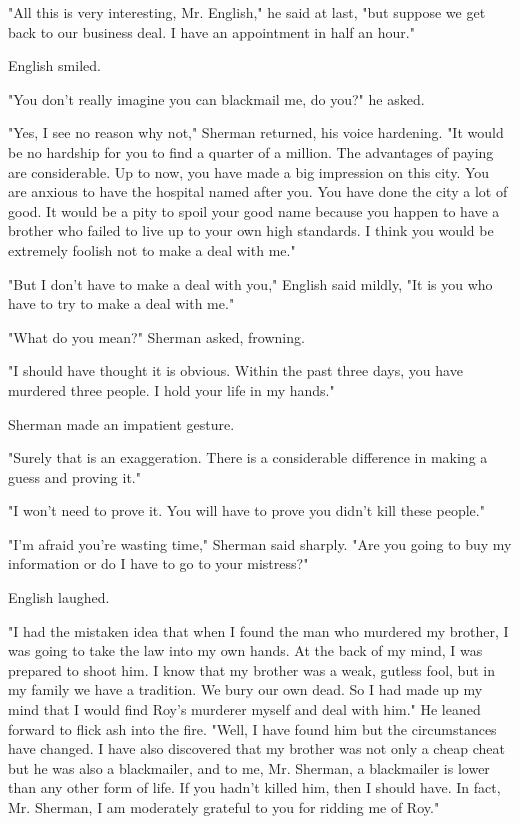 \documentclass{novel}
\begin{document}
"All this is very interesting, Mr. English," he said at last, "but suppose we get back to our business deal. I have an appointment in half an hour."

English smiled.

"You don't really imagine you can blackmail me, do you?" he asked.

"Yes, I see no reason why not," Sherman returned, his voice hardening. "It would be no hardship for you to find a quarter of a million. The advantages of paying are considerable. Up to now, you have made a big impression on this city. You are anxious to have the hospital named after you. You have done the city a lot of good. It would be a pity to spoil your good name because you happen to have a brother who failed to live up to your own high standards. I think you would be extremely foolish not to make a deal with me."

"But I don't have to make a deal with you," English said mildly, "It is you who have to try to make a deal with me."

"What do you mean?" Sherman asked, frowning.

"I should have thought it is obvious. Within the past three days, you have murdered three people. I hold your life in my hands."

Sherman made an impatient gesture.

"Surely that is an exaggeration. There is a considerable difference in making a guess and proving it."

"I won't need to prove it. You will have to prove you didn't kill these people."

"I'm afraid you're wasting time," Sherman said sharply. "Are you going to buy my information or do I have to go to your mistress?"

English laughed.

"I had the mistaken idea that when I found the man who murdered my brother, I was going to take the law into my own hands. At the back of my mind, I was prepared to shoot him. I know that my brother was a weak, gutless fool, but in my family we have a tradition. We bury our own dead. So I had made up my mind that I would find Roy's murderer myself and deal with him." He leaned forward to flick ash into the fire. "Well, I have found him but the circumstances have changed. I have also discovered that my brother was not only a cheap cheat but he was also a blackmailer, and to me, Mr. Sherman, a blackmailer is lower than any other form of life. If you hadn't killed him, then I should have. In fact, Mr. Sherman, I am moderately grateful to you for ridding me of Roy."
\end{document}
